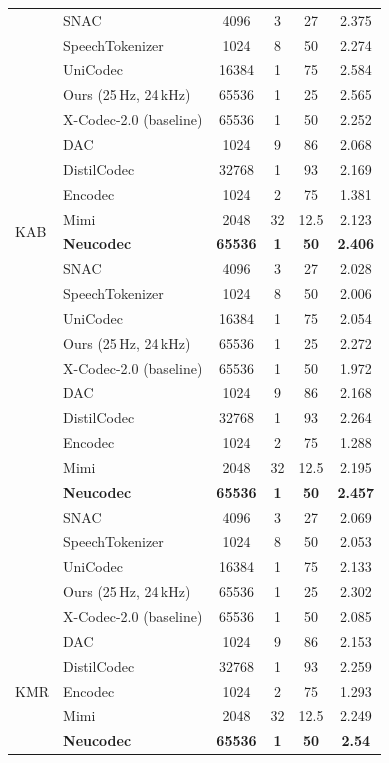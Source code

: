 \documentclass[preprint]{article}
\begin{document}
\begin{longtable}{llcccc}
  & SNAC & 4096 & 3 & 27 & 2.375 \\
  & SpeechTokenizer & 1024 & 8 & 50 & 2.274 \\
  & UniCodec & 16384 & 1 & 75 & 2.584 \\
  & Ours (25\,Hz, 24\,kHz) & 65536 & 1 & 25 & 2.565 \\
  & X-Codec-2.0 (baseline) & 65536 & 1 & 50 & 2.252 \\
\midrule
\multirow{8}{*}{KAB}
  & DAC & 1024 & 9 & 86 & 2.068 \\
  & DistilCodec & 32768 & 1 & 93 & 2.169 \\
  & Encodec & 1024 & 2 & 75 & 1.381 \\
  & Mimi & 2048 & 32 & 12.5 & 2.123 \\
  & \textbf{Neucodec} & \textbf{65536} & \textbf{1} & \textbf{50} & \textbf{2.406} \\
  & SNAC & 4096 & 3 & 27 & 2.028 \\
  & SpeechTokenizer & 1024 & 8 & 50 & 2.006 \\
  & UniCodec & 16384 & 1 & 75 & 2.054 \\
  & Ours (25\,Hz, 24\,kHz) & 65536 & 1 & 25 & 2.272 \\
  & X-Codec-2.0 (baseline) & 65536 & 1 & 50 & 1.972 \\
\newpage
\multirow{8}{*}{KK}
  & DAC & 1024 & 9 & 86 & 2.168 \\
  & DistilCodec & 32768 & 1 & 93 & 2.264 \\
  & Encodec & 1024 & 2 & 75 & 1.288 \\
  & Mimi & 2048 & 32 & 12.5 & 2.195 \\
  & \textbf{Neucodec} & \textbf{65536} & \textbf{1} & \textbf{50} & \textbf{2.457} \\
  & SNAC & 4096 & 3 & 27 & 2.069 \\
  & SpeechTokenizer & 1024 & 8 & 50 & 2.053 \\
  & UniCodec & 16384 & 1 & 75 & 2.133 \\
  & Ours (25\,Hz, 24\,kHz) & 65536 & 1 & 25 & 2.302 \\
  & X-Codec-2.0 (baseline) & 65536 & 1 & 50 & 2.085 \\
\midrule
\multirow{8}{*}{KMR}
  & DAC & 1024 & 9 & 86 & 2.153 \\
  & DistilCodec & 32768 & 1 & 93 & 2.259 \\
  & Encodec & 1024 & 2 & 75 & 1.293 \\
  & Mimi & 2048 & 32 & 12.5 & 2.249 \\
  & \textbf{Neucodec} & \textbf{65536} & \textbf{1} & \textbf{50} & \textbf{2.54} \\

\end{longtable}
\end{document}
